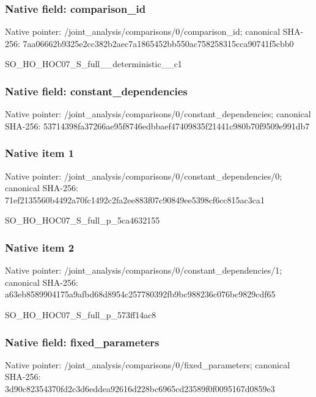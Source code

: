 \documentclass[10pt,a4paper]{article}
\begin{document}
\subsubsection{Native field: comparison\_\allowbreak{}id}
Native pointer: /joint\_\allowbreak{}analysis/comparisons/0/comparison\_\allowbreak{}id; canonical SHA-256: 7aa06662b9325e2cc382b2aec7a1865452bb550ac758258315cca90741f5cbb0

\begingroup\raggedright\sloppy SO\_\allowbreak{}HO\_\allowbreak{}HOC07\_\allowbreak{}S\_\allowbreak{}full\_\allowbreak{}\_\allowbreak{}deterministic\_\allowbreak{}\_\allowbreak{}c1\par\endgroup

\subsubsection{Native field: constant\_\allowbreak{}dependencies}
Native pointer: /joint\_\allowbreak{}analysis/comparisons/0/constant\_\allowbreak{}dependencies; canonical SHA-256: 53714398fa37266ae95f8746edbbaef47409835f21441c980b70f9509e991db7

\subsubsection{Native item 1}
Native pointer: /joint\_\allowbreak{}analysis/comparisons/0/constant\_\allowbreak{}dependencies/0; canonical SHA-256: 71ef2135560b4492a70fc1492c2fa2ee883f07c90849ee5398cf6cc815ac3ca1

\begingroup\raggedright\sloppy SO\_\allowbreak{}HO\_\allowbreak{}HOC07\_\allowbreak{}S\_\allowbreak{}full\_\allowbreak{}p\_\allowbreak{}5ca4632155\par\endgroup

\subsubsection{Native item 2}
Native pointer: /joint\_\allowbreak{}analysis/comparisons/0/constant\_\allowbreak{}dependencies/1; canonical SHA-256: a63eb8589904175a9afbd68d8954c257780392fb9bc988236c076bc9829cdf65

\begingroup\raggedright\sloppy SO\_\allowbreak{}HO\_\allowbreak{}HOC07\_\allowbreak{}S\_\allowbreak{}full\_\allowbreak{}p\_\allowbreak{}573ff14ac8\par\endgroup

\subsubsection{Native field: fixed\_\allowbreak{}parameters}
Native pointer: /joint\_\allowbreak{}analysis/comparisons/0/fixed\_\allowbreak{}parameters; canonical SHA-256: 3d90c82354370fd2c3d6eddea92616d228bc6965cd23589f0f0095167d0859e3
\end{document}
